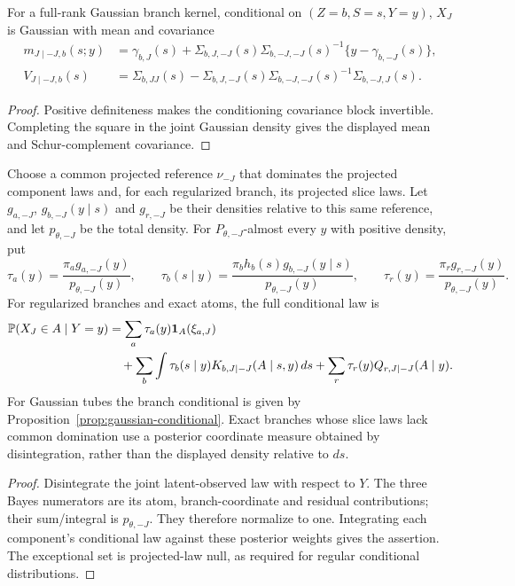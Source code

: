 \begin{proposition}
\label{prop:gaussian-conditional}
For a full-rank Gaussian branch kernel, conditional on $(Z=b,S=s,Y=y)$,
$X_J$ is Gaussian with mean and covariance
\begin{align*}
 m_{J\mid-J,b}(s;y)
 &=\gamma_{b,J}(s)+\Sigma_{b,J,-J}(s)\Sigma_{b,-J,-J}(s)^{-1}
                         \{y-\gamma_{b,-J}(s)\},\\
 V_{J\mid-J,b}(s)
 &=\Sigma_{b,JJ}(s)-\Sigma_{b,J,-J}(s)
            \Sigma_{b,-J,-J}(s)^{-1}\Sigma_{b,-J,J}(s).
\end{align*}
\end{proposition}
\begin{proof}
Positive definiteness makes the conditioning covariance block invertible.
Completing the square in the joint Gaussian density gives the displayed
mean and Schur-complement covariance.
\end{proof}

\begin{proposition}
\label{prop:full-conditional}
Choose a common projected reference $\nu_{-J}$ that dominates the projected
component laws and, for each regularized branch, its projected slice laws.
Let $g_{a,-J}$, $g_{b,-J}(y\mid s)$ and $g_{r,-J}$ be their densities
relative to this same reference, and let $p_{\theta,-J}$ be the total density.
For $P_{\theta,-J}$-almost every $y$ with positive density, put
\[
 \tau_a(y)=\frac{\pi_a g_{a,-J}(y)}{p_{\theta,-J}(y)},\qquad
 \tau_b(s\mid y)=\frac{\pi_bh_b(s)g_{b,-J}(y\mid s)}{p_{\theta,-J}(y)},
 \qquad
 \tau_r(y)=\frac{\pi_r g_{r,-J}(y)}{p_{\theta,-J}(y)}.
\]
For regularized branches and exact atoms, the full conditional law is
\begin{align*}
 \mathbb P(X_J\in A\mid Y=y)
 &=\sum_a\tau_a(y)\mathbf 1_A(\xi_{a,J})\\
 &\quad+\sum_b\int \tau_b(s\mid y)
       K_{b,J\mid-J}(A\mid s,y)\,ds
       +\sum_r\tau_r(y)Q_{r,J\mid-J}(A\mid y).
\end{align*}
For Gaussian tubes the branch conditional is given by
Proposition~\ref{prop:gaussian-conditional}. Exact branches whose slice laws
lack common domination use a posterior coordinate measure obtained by
disintegration, rather than the displayed density relative to $ds$.
\end{proposition}
\begin{proof}
Disintegrate the joint latent-observed law with respect to $Y$. The three
Bayes numerators are its atom, branch-coordinate and residual contributions;
their sum/integral is $p_{\theta,-J}$. They therefore normalize to one.
Integrating each component's conditional law against these posterior weights
gives the assertion. The exceptional set is projected-law null, as required
for regular conditional distributions.
\end{proof}

